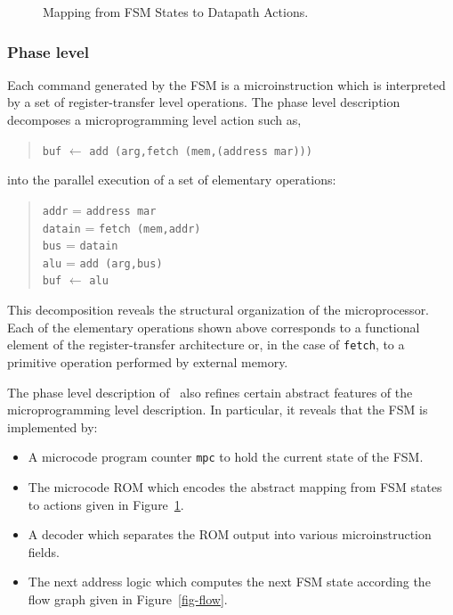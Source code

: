\begin{figure}
\begin{center}


\caption{Mapping from FSM States to Datapath Actions.}
\label{fig-map}
\end{center}
\end{figure}

\subsubsection{Phase level}
\label{sec-phase}

Each command generated by the FSM is a microinstruction which is
interpreted by a set of register-transfer level operations.
The phase level description decomposes
a microprogramming level action such as,

\begin{quote}
\verb"buf" $\leftarrow$ \verb"add (arg,fetch (mem,(address mar)))"
\end{quote}

\noindent
into the parallel execution of a set of elementary operations:

\begin{quote}
\verb"addr" = \verb"address mar"\\
\verb"datain" = \verb"fetch (mem,addr)"\\
\verb"bus" = \verb"datain"\\
\verb"alu" = \verb"add (arg,bus)"\\
\verb"buf" $\leftarrow$ \verb"alu"
\end{quote}

This decomposition reveals the structural organization of the
microprocessor.
Each of the elementary operations shown above corresponds to
a functional element of the register-transfer architecture
or, in the case of \verb"fetch",
to a primitive operation performed by external memory.

The phase level description of \Tamarack\ also refines certain
abstract features of the microprogramming level description.
In particular, it reveals that the FSM is implemented by:

\begin{itemize}
\item A microcode program counter \verb"mpc" to hold the current
state of the FSM.
\item The microcode ROM which encodes the abstract mapping
from FSM states to actions given in Figure~\ref{fig-map}.
\item A decoder which separates the ROM output into various
microinstruction fields.
\item The next address logic which computes the next FSM
state according the flow graph given in Figure~\ref{fig-flow}.
\end{itemize}

